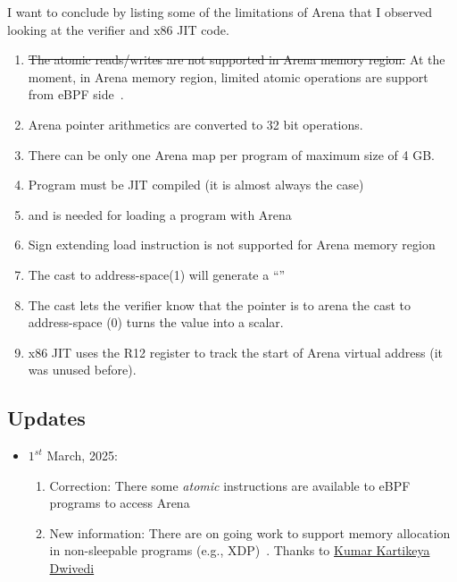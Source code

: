 \documentclass{article} \usepackage{graphicx}
\begin{document}
I want to conclude by listing some of the limitations of Arena that I observed
looking at the verifier and x86 JIT code.

\begin{enumerate}
  \item \sout{The atomic reads/writes are not supported in Arena memory region.} At the moment, in Arena memory region, limited atomic operations are support from eBPF side~\cite{arena_atomic}.
\item Arena pointer arithmetics are converted to 32 bit operations.
\item There can be only one Arena map per program of maximum size of 4 GB.
\item Program must be JIT compiled (it is almost always the case)
\item {} and  is needed for loading a program with Arena
\item Sign extending load instruction is not supported for Arena memory region
\item The cast to address-space(1) will generate a ``''
\item The cast lets the verifier know that the pointer is to arena
        the cast to address-space (0) turns the value into a scalar.
\item x86 JIT uses the R12 register to track the start of Arena virtual
    address (it was unused before).
\end{enumerate}

\subsection{Updates}
\begin{itemize}
  \item $1^{st}$ March, 2025:
    \begin{enumerate}
      \item Correction: There some \emph{atomic} instructions are available to eBPF programs to access Arena
      \item New information: There are on going work to support memory allocation in non-sleepable programs (e.g., XDP)~\cite{slub,try_alloc}. Thanks to \href{https://kkdwivedi.in/}{Kumar Kartikeya Dwivedi}
    \end{enumerate}
\end{itemize}



\end{document}
